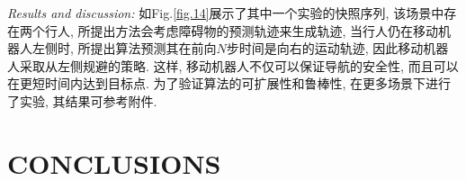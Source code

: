 \documentclass[preprint,5p,times,twocolumn]{elsarticle}
\begin{document}
\textit{Results and discussion: }
如Fig.\ref{fig.14}展示了其中一个实验的快照序列, 该场景中存在两个行人, 所提出方法会考虑障碍物的预测轨迹来生成轨迹, 当行人仍在移动机器人左侧时, 所提出算法预测其在前向$N$步时间是向右的运动轨迹, 因此移动机器人采取从左侧规避的策略.
这样, 移动机器人不仅可以保证导航的安全性, 而且可以在更短时间内达到目标点. 
为了验证算法的可扩展性和鲁棒性, 在更多场景下进行了实验, 其结果可参考附件.




\section{CONCLUSIONS}
\label{CONCLUSIONS}
\end{document}
